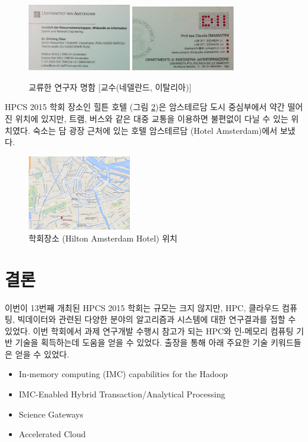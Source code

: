 \documentclass[twocolumn]{article}
\newcommand{\bi}{\begin{itemize}}
\newcommand{\ei}{\end{itemize}}
\newcommand{\ii}{\item}
\begin{document}
\begin{figure}[htb]
        \centering
        \includegraphics[width=0.4\textwidth]{nc02.png}
        \includegraphics[width=0.4\textwidth]{nc03.png}
        \caption{교류한 연구자 명함 [교수(네델란드, 이탈리아)]}
        \label{fig:namecards01}
\end{figure}

HPCS 2015 학회 장소인 힐튼 호텔 (그림 \ref{fig:map})은 암스테르담 도시 중심부에서 약간 떨어진 위치에 있지만, 트램, 버스와 같은 대중 교통을 이용하면 불편없이 다닐 수 있는 위치였다. 숙소는 담 광장 근처에 있는 호텔 암스테르담 (Hotel Amsterdam)에서 보냈다.

\begin{figure}[htb]
        \centering
        \includegraphics[width=0.4\textwidth]{map.png}
        \caption{학회장소 (Hilton Amsterdam Hotel) 위치}
        \label{fig:map}
\end{figure}

\section{결론}
이번이 13번째 개최된 HPCS 2015 학회는 규모는 크지 않지만, HPC, 클라우드 컴퓨팅, 빅데이터와 관련된 다양한 분야의 알고리즘과 시스템에 대한 연구결과를 접할 수 있었다.
이번 학회에서 과제 연구개발 수행시 참고가 되는 HPC와 인-메모리 컴퓨팅 기반 기술을 획득하는데 도움을 얻을 수 있었다. 출장을 통해 아래 주요한 기술 키워드들은 얻을 수 있었다.
\bi
\ii In-memory computing (IMC) capabilities for the Hadoop
\ii IMC-Enabled Hybrid Transaction/Analytical Processing
\ii Science Gateways
\ii Accelerated Cloud
\ei
\end{document}
